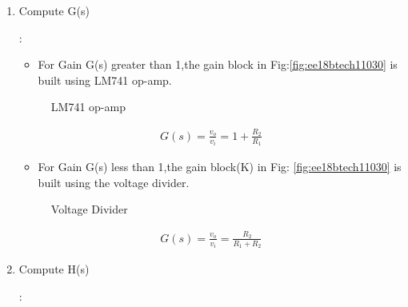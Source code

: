 \begin{enumerate}[label=\arabic*.,ref=\theenumi]
\item Compute G(s) 

\solution :

\begin{itemize}
    \item For Gain G(s) greater than 1,the gain block in Fig:\ref{fig:ee18btech11030} is built using LM741 op-amp.
\end{itemize}
\begin{figure}[!ht]
	\begin{center}
		\resizebox{\columnwidth/1}{!}{}
	\end{center}
	\caption{LM741 op-amp}
	\label{fig:ee18btech11030_fig5}
\end{figure}

\begin{align}
    G(s) = \frac{v_o}{v_i} = 1 + \frac{R_2}{R_1}
\end{align}

\begin{itemize}
    \item For Gain G(s) less than 1,the gain block(K) in Fig: \ref{fig:ee18btech11030} is built using the voltage divider.
\end{itemize}

\begin{figure}[!ht]
	\begin{center}
		\resizebox{\columnwidth/1}{!}{}
	\end{center}
	\caption{Voltage Divider}
	\label{fig:ee18btech11030_fig6}
\end{figure}

\begin{align}
    G(s) = \frac{v_o}{v_i} = \frac{R_2}{R_1 + R_2}
\end{align}

\item Compute H(s) 

\solution :


\end{enumerate}
